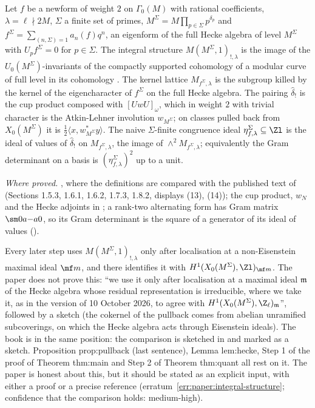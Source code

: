 \begin{sloppypar}
\begin{definition}\label{def:paper:dfg-objects}
Let $f$ be a newform of weight $2$ on $\Gamma_0(M)$ with rational coefficients, $\lambda=\ell\nmid2M$, $\Sigma$ a finite set of primes, $M^\Sigma=M\prod_{p\in\Sigma}p^{\delta_p}$ and
$f^\Sigma=\sum_{(n,\Sigma)=1}a_n(f)q^n$, an eigenform of the full Hecke algebra of level $M^\Sigma$ with $U_pf^\Sigma=0$ for $p\in\Sigma$. The integral structure $M(M^\Sigma,1)_{!,\lambda}$ is the image of
the $U_0(M^\Sigma)$-invariants of the compactly supported cohomology of a modular curve of full level in its cohomology \cite[Sections 1.2, 1.4]{DFG04}. The kernel lattice
$M_{f^\Sigma,\lambda}$ is the subgroup killed by the kernel of the eigencharacter of $f^\Sigma$ on the full Hecke algebra. The pairing $\hat\delta_!$ is the cup product composed with
$[UwU]_\omega$, which in weight $2$ with trivial character is the Atkin-Lehner involution $w_{M^\Sigma}$; on classes pulled back from $X_0(M^\Sigma)$ it is $\frac12\langle x,w^*_{M^\Sigma}y\rangle$.
The naive $\Sigma$-finite congruence ideal $\eta^\Sigma_{f,\lambda}\subseteq\Zl$ is the ideal of values of $\hat\delta_!$ on $M_{f^\Sigma,\lambda}$, the image of $\wedge^2M_{f^\Sigma,\lambda}$; equivalently the Gram
determinant on a basis is $(\eta^\Sigma_{f,\lambda})^2$ up to a unit.
\end{definition}

\noindent\emph{Where proved.} , where the definitions are compared with the published text of \cite{DFG04} (Sections 1.5.3, 1.6.1, 1.6.2, 1.7.3, 1.8.2,
displays (13), (14)); the cup product, $w_N$ and the Hecke adjoints in ; a rank-two alternating form has Gram matrix $\sm0a{-a}0$, so its Gram
determinant is the square of a generator of its ideal of values ().

\begin{warning}\label{warn:paper:integral-structure}
Every later step uses $M(M^\Sigma,1)_{!,\lambda}$ only after localisation at a non-Eisenstein maximal ideal $\mf m$, and there identifies it with $H^1(X_0(M^\Sigma),\Zl)_{\mf m}$. The paper
does not prove this: ``we use it only after localisation at a maximal ideal $\mathfrak m$ of the Hecke algebra whose residual representation is irreducible, where we take
it, as in the version of 10 October 2026, to agree with $H^1(X_0(M^\Sigma),\Z_\ell)_{\mathfrak m}$'', followed by a sketch (the cokernel of the pullback comes from abelian unramified
subcoverings, on which the Hecke algebra acts through Eisenstein ideals). The book is in the same position: the comparison is sketched in  and marked
as a sketch. Proposition prop:pullback (last sentence), Lemma lem:hecke, Step 1 of the proof of Theorem thm:main and Step 2 of Theorem thm:quant all rest on it. The
paper is honest about this, but it should be stated as an explicit input, with either a proof or a precise reference (erratum~\ref{err:paper:integral-structure}; confidence
that the comparison holds: medium-high).
\end{warning}


\end{sloppypar}
